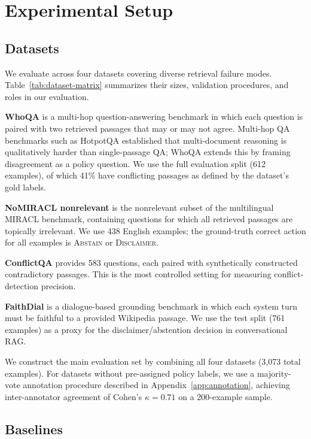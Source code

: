 \section{Experimental Setup}
\label{sec:setup}

\subsection{Datasets}

We evaluate across four datasets covering diverse retrieval failure modes. Table~\ref{tab:dataset-matrix} summarizes their sizes, validation procedures, and roles in our evaluation.

\textbf{WhoQA} \citep{whoqa2025} is a multi-hop question-answering benchmark in which each question is paired with two retrieved passages that may or may not agree. Multi-hop QA benchmarks such as HotpotQA \citep{yang2018hotpotqa} established that multi-document reasoning is qualitatively harder than single-passage QA; WhoQA extends this by framing disagreement as a policy question. We use the full evaluation split (612 examples), of which 41\% have conflicting passages as defined by the dataset's gold labels.

\textbf{NoMIRACL nonrelevant} \citep{nomiracl2024} is the nonrelevant subset of the multilingual MIRACL benchmark, containing questions for which all retrieved passages are topically irrelevant. We use 438 English examples; the ground-truth correct action for all examples is \textsc{Abstain} or \textsc{Disclaimer}.

\textbf{ConflictQA} \citep{conflictqa2023} provides 583 questions, each paired with synthetically constructed contradictory passages. This is the most controlled setting for measuring conflict-detection precision.

\textbf{FaithDial} \citep{dziri2022faithdial} is a dialogue-based grounding benchmark in which each system turn must be faithful to a provided Wikipedia passage. We use the test split (761 examples) as a proxy for the disclaimer/abstention decision in conversational RAG.

We construct the main evaluation set by combining all four datasets (3,073 total examples). For datasets without pre-assigned policy labels, we use a majority-vote annotation procedure described in Appendix~\ref{app:annotation}, achieving inter-annotator agreement of Cohen's $\kappa = 0.71$ \citep{cohen1960coefficient} on a 200-example sample.

\subsection{Baselines}


